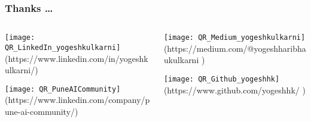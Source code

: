 \begin{frame}[fragile]\frametitle{Thanks \ldots}
\begin{columns}
    \begin{column}[T]{0.5\linewidth}

		\begin{center}
		\texttt{[image: QR\_LinkedIn\_yogeshkulkarni]}
				{\tiny (https://www.linkedin.com/in/yogeshkulkarni/)} %
				
		\texttt{[image: QR\_PuneAICommunity]}
				{\tiny (https://www.linkedin.com/company/pune-ai-community/)} %
				
								
		\end{center}			
    \end{column}
    \begin{column}[T]{0.5\linewidth}
		\begin{center}
		\texttt{[image: QR\_Medium\_yogeshkulkarni]}
				{\tiny (https://medium.com/@yogeshharibhaukulkarni )}	 %
				
		\texttt{[image: QR\_Github\_yogeshhk]}
				{\tiny (https://www.github.com/yogeshhk/ )}	 %
								
		\end{center}	
    \end{column}
  \end{columns}
\end{frame}